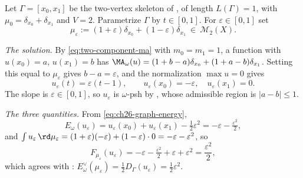\begin{example}
\label{ex:ch28-affine-family}
Let $\Gamma=[x_0,x_1]$ be the two-vertex skeleton of
, of length $L(\Gamma)=1$, with
$\mu_0=\delta_{x_0}+\delta_{x_1}$ and $V=2$.  Parametrize $\Gamma$ by
$t\in[0,1]$.  For $\varepsilon\in[0,1]$ set
\[
 \mu_\varepsilon:=(1+\varepsilon)\delta_{x_0}
                 +(1-\varepsilon)\delta_{x_1}
 \ \in\ \mathcal M_2(X).
\]

\emph{The solution.}  By \eqref{eq:two-component-ma} with
$m_0=m_1=1$, a function with $u(x_0)=a$, $u(x_1)=b$ has
$\MA_\omega(u)=(1+b-a)\delta_{x_0}+(1+a-b)\delta_{x_1}$.  Setting this
equal to $\mu_\varepsilon$ gives $b-a=\varepsilon$, and the
normalization $\max u=0$ gives
\begin{equation}
\label{eq:ch28-affine-solution}
 u_\varepsilon(t)=\varepsilon(t-1),
 \qquad
 u_\varepsilon(x_0)=-\varepsilon,\quad u_\varepsilon(x_1)=0 .
\end{equation}
The slope is $\varepsilon\in[0,1]$, so $u_\varepsilon$ is
$\omega$-psh by , whose admissible region is
$|a-b|\leq1$.

\emph{The three quantities.}  From \eqref{eq:ch26-graph-energy},
\[
 E_\omega(u_\varepsilon)
 =u_\varepsilon(x_0)+u_\varepsilon(x_1)-\tfrac12\varepsilon^2
 =-\varepsilon-\tfrac{\varepsilon^2}2 ,
\]
and
$\int u_\varepsilon\,\rd\mu_\varepsilon
=(1+\varepsilon)(-\varepsilon)+(1-\varepsilon)\cdot0
=-\varepsilon-\varepsilon^2$, so
\[
 F_{\mu_\varepsilon}(u_\varepsilon)
 =-\varepsilon-\tfrac{\varepsilon^2}2+\varepsilon+\varepsilon^2
 =\frac{\varepsilon^2}2 ,
\]
which agrees with :
$E^\vee_\omega(\mu_\varepsilon)=\tfrac12D_\Gamma(u_\varepsilon)
=\tfrac12\varepsilon^2$.


\end{example}

